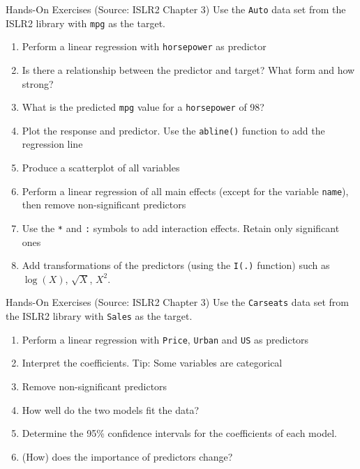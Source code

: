\documentclass[ignorenonframetext,xcolor=x11names]{beamer}
\begin{document}
\begin{frame}{Hands-On Exercises}
{\small (Source: ISLR2 Chapter 3)}
\small
Use the \texttt{Auto} data set from the ISLR2 library with \texttt{mpg} as the target.
  \begin{enumerate}
     \item Perform a linear regression with \texttt{horsepower} as predictor
     \item Is there a relationship between the predictor and target? What form and how strong?
     \item What is the predicted \texttt{mpg} value for a \texttt{horsepower} of 98? 
     \item Plot the response and predictor. Use the \texttt{abline()} function to add the regression line
     \item Produce a scatterplot of all variables
     \item Perform a linear regression of all main effects (except for the variable \texttt{name}), then remove non-significant predictors
     \item Use the \texttt{*} and \texttt{:} symbols to add interaction effects. Retain only significant ones
     \item Add transformations of the predictors (using the \texttt{I(.)} function) such as $\log(X)$, $\sqrt{X}$, $X^2$.
  \end{enumerate}
\end{frame}

\begin{frame}{Hands-On Exercises}
{\small (Source: ISLR2 Chapter 3)}
\small
Use the \texttt{Carseats} data set from the ISLR2 library with \texttt{Sales} as the target.
  \begin{enumerate}
     \item Perform a linear regression with \texttt{Price}, \texttt{Urban} and \texttt{US} as predictors
     \item Interpret the coefficients. Tip: Some variables are categorical
     \item Remove non-significant predictors
     \item How well do the two models fit the data?
     \item Determine the 95\% confidence intervals for the coefficients of each model.
     \item (How) does the importance of predictors change?
  \end{enumerate}
\end{frame}
\end{document}
